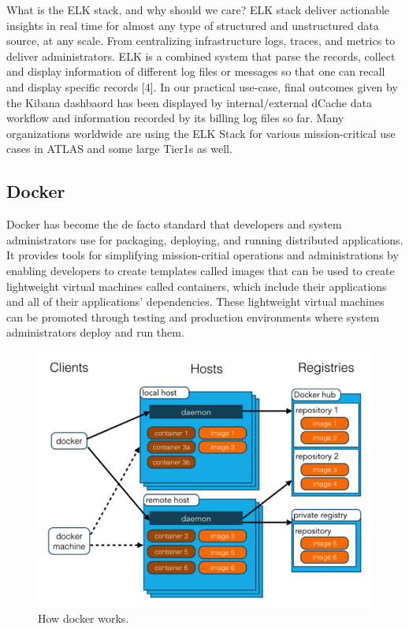 \documentclass[]{article}
\begin{document}
What is the ELK stack, and why should we care? ELK stack deliver
actionable insights in real time for almost any type of structured and
unstructured data source, at any scale. From centralizing infrastructure
logs, traces, and metrics to deliver administrators. ELK is a combined
system that parse the records, collect and display information of
different log files or messages so that one can recall and display
specific records {[}4{]}. In our practical use-case, final outcomes
given by the Kibana dashbaord has been displayed by internal/external
dCache data workflow and information recorded by its billing log files
so far. Many organizations worldwide are using the ELK Stack for various
mission-critical use cases in ATLAS and some large Tier1s as well.

\subsection{Docker}\label{docker}

Docker has become the de facto standard that developers and system
administrators use for packaging, deploying, and running distributed
applications. It provides tools for simplifying mission-critial
operations and administrations by enabling developers to create
templates called images that can be used to create lightweight virtual
machines called containers, which include their applications and all of
their applications' dependencies. These lightweight virtual machines can
be promoted through testing and production environments where system
administrators deploy and run them.

\begin{figure}[htbp]
\centering
\includegraphics{images/docker.png}
\caption{How docker works.}
\end{figure}
\end{document}
